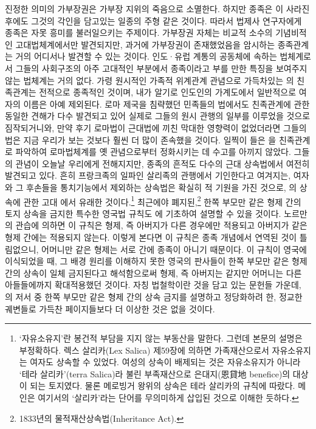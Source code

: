 진정한 의미의 가부장권은 가부장 지위의 죽음으로 소멸한다.
하지만 종족은 이 사라진 후에도 그것의 각인을 담고있는
일종의 주형 같은 것이다.
따라서 법제사 연구자에게 종족은 자못 흥미를 불러일으키는 주제이다.
가부장권 자체는 비교적 소수의 기념비적인 고대법체계에서만 발견되지만,
과거에 가부장권이 존재했었음을 암시하는 종족관계는
거의 어디서나 발견할 수 있는 것이다.
인도^^b7유럽 계통의 공동체에 속하는 법체계로서
그들의 사회구조의 아주 고대적인 부분에서
종족이라고 부를 만한 특징을 보여주지 않는 법체계는 거의 없다.
가령
원시적인 가족적 위계관계 관념으로 가득차있는
의 친족관계는 전적으로 종족적인 것이며,
내가 알기로 인도인의 가계도에서 일반적으로 여자의 이름은 아예 제외된다.
로마 제국을 침략했던 민족들의 법에서도
친족관계에 관한 동일한 견해가 다수 발견되고 있어
실제로
그들의 원시 관행의 일부를 이루었을 것으로 짐작되거니와,
만약 후기 로마법이 근대법에 끼친 막대한 영향력이 없었더라면
그들의 법은 지금 우리가 보는 것보다 훨씬 더 많이 존속했을 것이다.
일찍이 들은 을  친족관계로 파악하여
로마법체계를 옛 관념으로부터 정화시키는 데 수고를 아끼지 않았다.
그들의 관념이 오늘날 우리에게 전해지지만,
종족의 흔적도 다수의 근대 상속법에서 여전히 발견되고 있다.
흔히 프랑크족의 일파인 살리족의 관행에서
기인한다고 여겨지는,
여자와 그 후손들을 통치기능에서 제외하는 상속법은
확실히 적 기원을 가진 것으로,
의 상속에 관한
고대 에서 유래한 것이다.\footnote{%
  `자유소유지'란 봉건적 부담을 지지 않는 부동산을 말한다.
  그런데 본문의 설명은 부정확하다.
  렉스 살리카(Lex Salica) 제59장에 의하면
  가족재산으로서 자유소유지는 여자도 상속할 수 있었다.
  여성의 상속이 배제되는 것은 자유소유지가 아니라
  `테라 살리카'(terra Salica)라 불린 부족재산으로
  은대지(恩貸地 benefice)의 대상이 되는 토지였다.
  물론 메로빙거 왕위의 상속은 테라 살리카의 규칙에 따랐다.
  메인은 여기서의 `살리카'라는 단어를 무의미하게 삽입된 것으로 이해한 듯하다.
   }
최근에야 폐지된,\footnote{%
  1833년의 물적재산상속법(Inheritance Act). }
한쪽 부모만 같은 형제 간의 토지 상속을 금지한
특수한 영국법 규칙도 에 기초하여 설명할 수 있을 것이다.
노르만의 관습에 의하면
이 규칙은  형제,
즉 아버지가 다른 경우에만 적용되고
아버지가 같은 형제 간에는 적용되지 않는다.
이렇게 본다면 이 규칙은 종족 개념에서 연역된 것이 틀림없으니,
어머니만 같은 형제는 서로 간에 종족이 아니기 때문이다.
이 규칙이 영국에 이식되었을 때,
그 배경 원리를 이해하지 못한 영국의 판사들이
한쪽 부모만 같은 형제 간의 상속이 일체 금지된다고 해석함으로써
 형제,
즉 아버지는 같지만 어머니는 다른 아들들에까지 확대적용했던 것이다.
자칭 법철학이란 것을 담고 있는 문헌들 가운데,
의 저서 중
한쪽 부모만 같은 형제 간의 상속 금지를 설명하고 정당화하려 한,
정교한 궤변들로 가득찬 페이지들보다 더 이상한 것은 없을 것이다.

